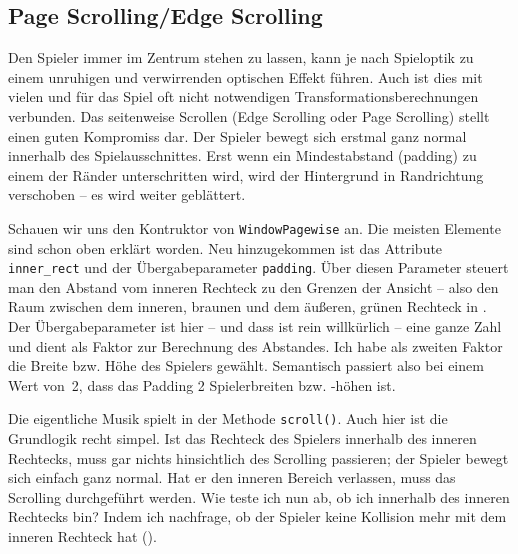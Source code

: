 


\subsection{Page Scrolling/Edge Scrolling}

Den Spieler immer im Zentrum stehen zu lassen, kann je nach Spieloptik zu einem unruhigen und verwirrenden optischen Effekt führen. Auch ist dies mit vielen und für das Spiel oft nicht notwendigen Transformationsberechnungen verbunden. Das seitenweise Scrollen (Edge Scrolling oder Page Scrolling) stellt einen guten Kompromiss dar. Der Spieler bewegt sich erstmal ganz normal innerhalb des Spielausschnittes. Erst wenn ein Mindestabstand (\Gls{padding}) zu einem der Ränder unterschritten wird, wird der Hintergrund in Randrichtung verschoben -- es wird weiter geblättert.

Schauen wir uns den Kontruktor von \texttt{WindowPagewise} an. Die meisten Elemente sind schon oben erklärt worden. Neu hinzugekommen ist das Attribute \texttt{inner\_rect} und der Übergabeparameter \texttt{padding}. Über diesen Parameter steuert man den Abstand vom inneren Rechteck zu den Grenzen der Ansicht -- also den Raum zwischen dem inneren, braunen und dem äußeren, grünen Rechteck in . Der Übergabeparameter ist hier -- und dass ist rein willkürlich -- eine ganze Zahl und dient als Faktor zur Berechnung des Abstandes. Ich habe als zweiten Faktor die Breite bzw. Höhe des Spielers gewählt. Semantisch passiert also bei einem Wert von~2, dass das Padding 2 Spielerbreiten bzw. -höhen ist.


Die eigentliche Musik spielt in der Methode \texttt{scroll()}. Auch hier ist die Grundlogik recht simpel. Ist das Rechteck des Spielers innerhalb des inneren Rechtecks, muss gar nichts hinsichtlich des Scrolling passieren; der Spieler bewegt sich einfach ganz normal. Hat er den inneren Bereich verlassen, muss das Scrolling durchgeführt werden. Wie teste ich nun ab, ob ich innerhalb des inneren Rechtecks bin? Indem ich nachfrage, ob der Spieler keine Kollision mehr mit dem inneren Rechteck hat ().

